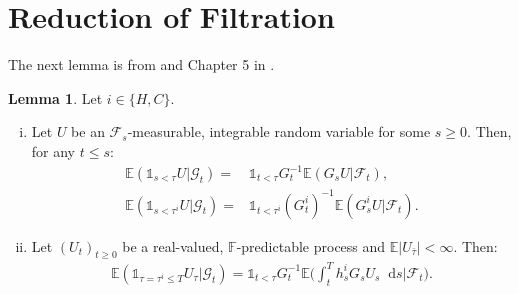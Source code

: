 \documentclass[a4paper, 11pt]{article}              %
\numberwithin{equation}{section}
\theoremstyle{plain}
\newcommand{\btau}{\bar{\tau}}
\newcommand{\1}{\mathds{1}}
\newcommand{\calF}{\mathcal{F}}
\newcommand{\calG}{\mathcal{G}}
\newcommand{\dsE}{\mathbb{E}}
\newcommand{\dsF}{\mathbb{F}}
\theoremstyle{plain}
\newtheorem{lemma}[thm]{Lemma}
\theoremstyle{definition}
\newtheorem{lemma}{Lemma}
\theoremstyle{plain}
\newcommand*\df{\mathop{}\!\mathrm{d}}
\begin{document}
\section{Reduction of Filtration}
\label{app:red}
The next lemma is from \cite{bielecki2008pricing} and Chapter 5 in
\cite{bielecki2010credit}.  
\begin{lemma}\label{lem:red} Let $i \in \{H, C\}$.
\begin{enumerate}[(i)]
\item Let $U$ be an $\calF_s$-measurable, integrable random variable for some
  $s \geq0$. Then, for any $t \leq s$:
  \begin{align}
    \dsE(\1_{s <\tau}U\vert \calG_t) =& \1_{t < \tau}G_t^{-1}
    \dsE (G_sU \vert\calF_t), \nonumber\\
    \dsE(\1_{s <\tau^i}U\vert \calG_t) =& \1_{t < \tau^i}(G^i_t)^{-1}
    \dsE (G^i_sU \vert\calF_t). \nonumber
  \end{align}
\item Let $(U_t)_{t \geq0}$ be a real-valued, $\dsF$-predictable process and
  $\dsE\vert U_{\btau} \vert < \infty$. Then:
  \begin{align}
    \dsE(\1_{\tau = \tau^i \leq T}U_{\tau}\vert \calG_t) =
    \1_{t< \tau}G_t^{-1}\dsE\Big( \int_{t}^{T}h^i_s G_sU_s\df s \Big\vert \calF_t\Big). \nonumber
  \end{align}
\end{enumerate}
\end{lemma} 
\end{document}

